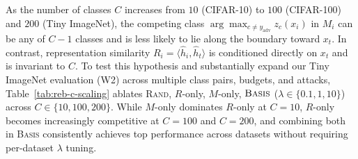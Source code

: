 As the number of classes $C$ increases from $10$ (CIFAR-10) to $100$ (CIFAR-100) and $200$ (Tiny ImageNet), the competing class $\arg\max_{c \neq y_{\text{adv}}} z_c(x_i)$ in $M_i$ can be any of $C-1$ classes and is less likely to lie along the boundary toward $x_t$. In contrast, representation similarity $R_i = \langle \hat{h}_i, \hat{h}_t \rangle$ is conditioned directly on $x_t$ and is invariant to $C$. To test this hypothesis and substantially expand our Tiny ImageNet evaluation (W2) across multiple class pairs, budgets, and attacks, Table~\ref{tab:reb-c-scaling} ablates \textsc{Rand}, $R$-only, $M$-only, $\textsc{Basis}$ ($\lambda \in \{0.1, 1, 10\}$) across $C \in \{10, 100, 200\}$. While $M$-only dominates $R$-only at $C=10$, $R$-only becomes increasingly competitive at $C=100$ and $C=200$, and combining both in \textsc{Basis} consistently achieves top performance across datasets without requiring per-dataset $\lambda$ tuning.


